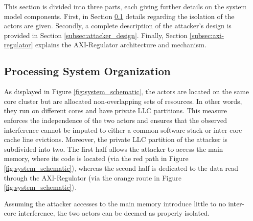     This section is divided into three parts, each giving further details on the system model components.
    First, in Section \ref{subsec:processing_system_organization} details regarding the isolation of the actors are given.
    Secondly, a complete description of the attacker's design is provided in Section \ref{subsec:attacker_design}.
    Finally, Section \ref{subsec:axi-regulator} explains the AXI-Regulator architecture and mechanism.

    \subsection{Processing System Organization}
        \label{subsec:processing_system_organization}
        As displayed in Figure \ref{fig:system_schematic}, the actors are located on the same core cluster but are allocated non-overlapping sets of resources.
        In other words, they run on different cores and have private LLC partitions.
        This measure enforces the independence of the two actors and ensures that the observed interference cannot be imputed to either a common software stack or inter-core cache line evictions.
        Moreover, the private LLC partition of the attacker is subdivided into two.
        The first half allows the attacker to access the main memory, where its code is located (via the red path in Figure \ref{fig:system_schematic}), whereas the second half is dedicated to the data read through the AXI-Regulator (via the orange route in Figure \ref{fig:system_schematic}).

        Assuming the attacker accesses to the main memory introduce little to no inter-core interference, the two actors can be deemed as properly isolated.


